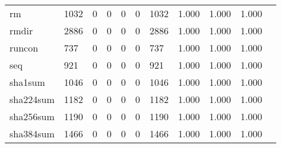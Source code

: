 \begin{longtable}{lp{1.10cm}p{1.10cm}p{1.10cm}p{1.10cm}p{1.10cm}p{1.10cm}p{1.10cm}p{1.10cm}p{1.10cm}p{1.10cm}}
rm        &                   1032 &                                  0 &                                 0 &                                0 &                                 0 &                            1032 &                          1.000 &                                 1.000 &                               1.000 \\
rmdir     &                   2886 &                                  0 &                                 0 &                                0 &                                 0 &                            2886 &                          1.000 &                                 1.000 &                               1.000 \\
runcon    &                    737 &                                  0 &                                 0 &                                0 &                                 0 &                             737 &                          1.000 &                                 1.000 &                               1.000 \\
seq       &                    921 &                                  0 &                                 0 &                                0 &                                 0 &                             921 &                          1.000 &                                 1.000 &                               1.000 \\
sha1sum   &                   1046 &                                  0 &                                 0 &                                0 &                                 0 &                            1046 &                          1.000 &                                 1.000 &                               1.000 \\
sha224sum &                   1182 &                                  0 &                                 0 &                                0 &                                 0 &                            1182 &                          1.000 &                                 1.000 &                               1.000 \\
sha256sum &                   1190 &                                  0 &                                 0 &                                0 &                                 0 &                            1190 &                          1.000 &                                 1.000 &                               1.000 \\
sha384sum &                   1466 &                                  0 &                                 0 &                                0 &                                 0 &                            1466 &                          1.000 &                                 1.000 &                               1.000 \\

\end{longtable}
